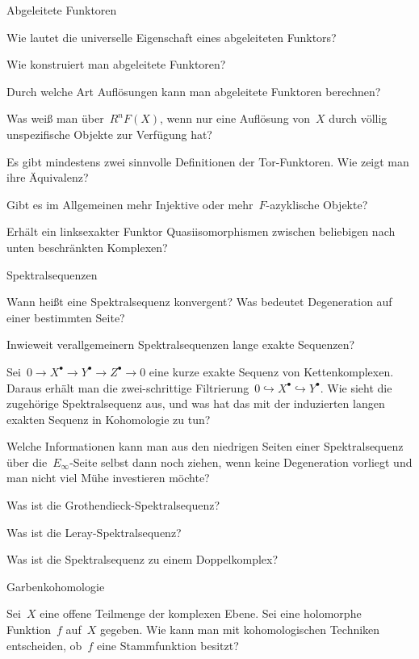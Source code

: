\documentclass{uebblatt}
\begin{document}
\begin{aufgabeE}{Abgeleitete Funktoren}
\item Wie lautet die universelle Eigenschaft eines abgeleiteten Funktors?
\item Wie konstruiert man abgeleitete Funktoren?
\item Durch welche Art Auflösungen kann man abgeleitete Funktoren berechnen?
\item Was weiß man über~$R^nF(X)$, wenn nur eine Auflösung von~$X$ durch völlig
unspezifische Objekte zur Verfügung hat?
\item Es gibt mindestens zwei sinnvolle Definitionen der Tor-Funktoren. Wie
zeigt man ihre Äquivalenz?
\item Gibt es im Allgemeinen mehr Injektive oder mehr~$F$-azyklische Objekte?
\item Erhält ein linksexakter Funktor Quasiisomorphismen zwischen beliebigen
nach unten beschränkten Komplexen?
\end{aufgabeE}

\begin{aufgabeE}{Spektralsequenzen}
\item Wann heißt eine Spektralsequenz konvergent? Was bedeutet Degeneration auf
einer bestimmten Seite?
\item Inwieweit verallgemeinern Spektralsequenzen lange exakte Sequenzen?
\item Sei~$0 \to X^\bullet \to Y^\bullet \to Z^\bullet \to 0$ eine kurze exakte
Sequenz von Kettenkomplexen. Daraus erhält man die zwei-schrittige
Filtrierung~$0 \hookrightarrow X^\bullet \hookrightarrow Y^\bullet$. Wie sieht
die zugehörige Spektralsequenz aus, und was hat das mit der induzierten langen
exakten Sequenz in Kohomologie zu tun?
\item Welche Informationen kann man aus den niedrigen Seiten einer
Spektralsequenz über die~$E_\infty$-Seite selbst dann noch ziehen, wenn keine
Degeneration vorliegt und man nicht viel Mühe investieren möchte?
\item Was ist die Grothendieck-Spektralsequenz?
\item Was ist die Leray-Spektralsequenz?
\item Was ist die Spektralsequenz zu einem Doppelkomplex?
\end{aufgabeE}

\begin{aufgabeE}{Garbenkohomologie}
\item Sei~$X$ eine offene Teilmenge der komplexen Ebene. Sei eine holomorphe
Funktion~$f$ auf~$X$ gegeben. Wie kann man mit kohomologischen Techniken
entscheiden, ob~$f$ eine Stammfunktion besitzt?
\end{aufgabeE}
\end{document}
